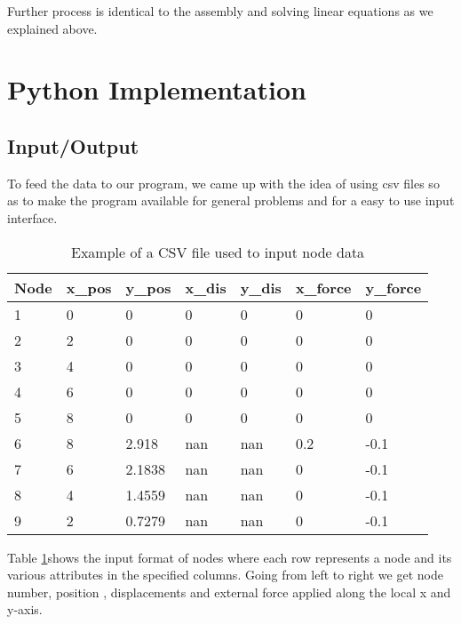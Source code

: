 Further process is identical to the assembly and solving linear equations as we explained above.
\pagebreak
\section{\bf Python Implementation}

\subsection{Input/Output}
To feed the data to our program, we came up with the idea of using csv files so as to make the program available for general problems and for a easy to use input interface.\\


\begin{table}[h!]
	\centering
	\begin{tabular}{|l|l|l|l|l|l|l|}
		\hline
		Node & x\_pos & y\_pos & x\_dis & y\_dis & x\_force & y\_force \\
		\hline
		1    & 0      & 0      & 0      & 0      & 0        & 0        \\
		2    & 2      & 0      & 0      & 0      & 0        & 0        \\
		3    & 4      & 0      & 0      & 0      & 0        & 0        \\
		4    & 6      & 0      & 0      & 0      & 0        & 0        \\
		5    & 8      & 0      & 0      & 0      & 0        & 0        \\
		6    & 8      & 2.918  & nan    & nan    & 0.2      & -0.1     \\
		7    & 6      & 2.1838 & nan    & nan    & 0        & -0.1     \\
		8    & 4      & 1.4559 & nan    & nan    & 0        & -0.1     \\
		9    & 2      & 0.7279 & nan    & nan    & 0        & -0.1  	\\
		\hline  
	\end{tabular}
		\caption{Example of a CSV file used to input node data}
	\label{node_csv_table}
\end{table}

Table \ref{node_csv_table}shows the input format of nodes where each row represents a node and its various attributes in the specified columns. Going from left to right we get node number, position , displacements and external force applied along the local x and y-axis.\\

